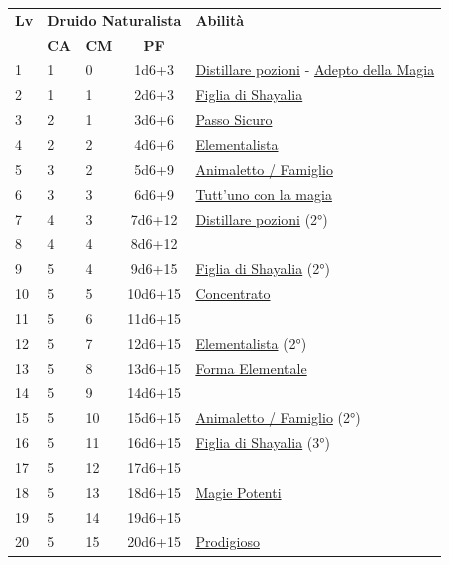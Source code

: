 {\begin{multicols}{2}

\noindent\begin{tabularx}{\linewidth}{p{0.3cm}|p{0.3cm}p{0.3cm}c|X|}
	\toprule
 \rowcolor{gray!20}	\textbf{Lv} & \multicolumn{3}{c|}{\textbf{Druido Naturalista}} & \textbf{Abilità} \\
& \centering\arraybackslash \textbf{CA} & \centering\arraybackslash \textbf{CM} & \centering\arraybackslash \textbf{PF} & \\
	\toprule
	1 &1	& 0	&	1d6+3	&\hyperlink{Distillare pozioni}{Distillare pozioni} - \hyperlink{Adepto della Magia}{Adepto della Magia}\\
 \rowcolor{gray!20}2	&	1	& 1	&	2d6+3	&\hyperlink{Figlia di Shayalia}{Figlia di Shayalia}\\
	3	&	2	& 1	&	3d6+6	&\hyperlink{Passo Sicuro}{Passo Sicuro}\\
 \rowcolor{gray!20}4	&	2	& 2	&	4d6+6	&\hyperlink{Elementalista}{Elementalista}\\
	5	&	3	& 2	&	5d6+9	&\hyperlink{Animaletto / Famiglio}{Animaletto / Famiglio}\\
 \rowcolor{gray!20}6	&	3	& 3	&	6d6+9	&\hyperlink{Tutt'uno con la magia}{Tutt'uno con la magia}\\
	7	&	4	& 3	&	7d6+12	&\hyperlink{Distillare pozioni}{Distillare pozioni} (2°)\\
 \rowcolor{gray!20}8	&	4	& 4	&	8d6+12	&\\
	9	&	5	& 4	&	9d6+15	&\hyperlink{Figlia di Shayalia}{Figlia di Shayalia} (2°)\\
 \rowcolor{gray!20}10	&	5	& 5	&	10d6+15	&\hyperlink{Concentrato}{Concentrato}\\
	11	&	5	& 6	&	11d6+15	&\\
 \rowcolor{gray!20}12	&	5	& 7	&	12d6+15	&\hyperlink{Elementalista}{Elementalista} (2°)\\
	13	&	5	& 8	&	13d6+15	&\hyperlink{Forma Elementale}{Forma Elementale}\\
 \rowcolor{gray!20}14	&	5	& 9	&	14d6+15	&\\
	15	&	5	& 10	&	15d6+15	&\hyperlink{Animaletto / Famiglio}{Animaletto / Famiglio} (2°)\\
 \rowcolor{gray!20}16	&	5	& 11	&	16d6+15	&\hyperlink{Figlia di Shayalia}{Figlia di Shayalia} (3°)\\
	17	&	5	& 12	&	17d6+15	&\\
 \rowcolor{gray!20}18	&	5	& 13	&	18d6+15	&\hyperlink{Magie Potenti}{Magie Potenti}\\
	19	&	5	& 14	&	19d6+15	&\\
 \rowcolor{gray!20}20	&	5	& 15	&	20d6+15	&\hyperlink{Prodigioso}{Prodigioso}\\
\end{tabularx}


\end{multicols}}
